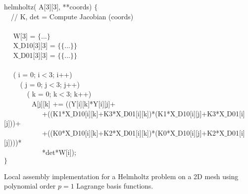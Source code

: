 \begin{algorithm}[t]
\scriptsize
{}

 helmholtz( A[3][3],  **coords) $\lbrace$\\
~~// K, det = Compute Jacobian (coords) \\
~~\\
~~ W[3] = $\lbrace$...$\rbrace$\\
~~ X$\_$D10[3][3] = $\lbrace\lbrace$...$\rbrace\rbrace$\\
~~ X$\_$D01[3][3] = $\lbrace\lbrace$...$\rbrace\rbrace$\\
~~\\
~~ ( i = 0; i$<$3; i++) \\
~~~~ ( j = 0; j$<$3; j++) \\
~~~~~~ ( k = 0; k$<$3; k++) \\
~~~~~~~~A[j][k] += ((Y[i][k]*Y[i][j]+\\
~~~~~~~~~~~+((K1*X$\_$D10[i][k]+K3*X$\_$D01[i][k])*(K1*X$\_$D10[i][j]+K3*X$\_$D01[i][j]))+\\
~~~~~~~~~~~+((K0*X$\_$D10[i][k]+K2*X$\_$D01[i][k])*(K0*X$\_$D10[i][j]+K2*X$\_$D01[i][j])))*\\
~~~~~~~~~~~*det*W[i]);\\
$\rbrace$
\caption{Local assembly implementation for a Helmholtz problem on a 2D mesh using polynomial order $p=1$ Lagrange basis functions.}
\label{code:helmholtz}
\end{algorithm}

